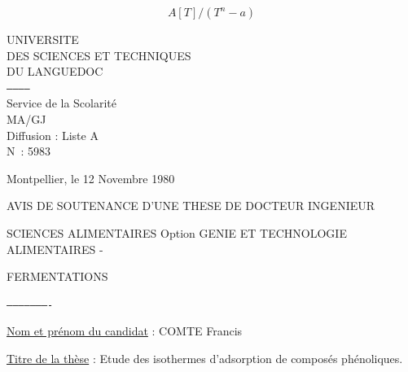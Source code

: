 



\[
A[T]/(T^n-a)
\]


UNIVERSITE\\
DES SCIENCES ET TECHNIQUES\\
DU LANGUEDOC\\
\texttt{------------}\\
Service de la Scolarité\\
MA/GJ\\
Diffusion : Liste A\\
N\textdegree\ : 5983

Montpellier, le 12 Novembre 1980

AVIS DE SOUTENANCE D'UNE THESE DE DOCTEUR INGENIEUR

SCIENCES ALIMENTAIRES Option GENIE ET TECHNOLOGIE ALIMENTAIRES -

FERMENTATIONS

\texttt{----------------------}

\uline{Nom et prénom du candidat} : COMTE Francis

\uline{Titre de la thèse} : Etude des isothermes d'adsorption de composés phénoliques.

